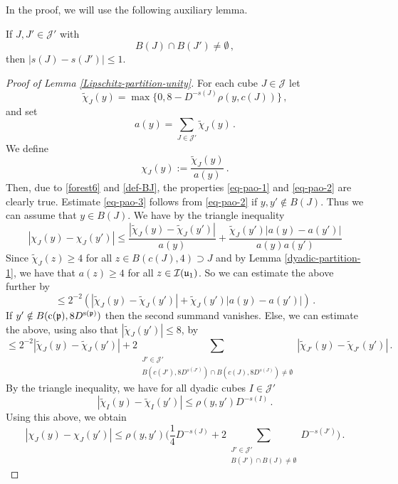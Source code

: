 {    In the proof, we will use the following auxiliary lemma.

    \begin{lemma}
        \label{moderate-scale-change}

        If $J, J' \in \mathcal{J'}$ with
        $$
            B(J) \cap B(J') \ne \emptyset\,,
        $$
        then $|s(J) - s(J')| \le 1$.
    \end{lemma}

    \begin{proof}[Proof of Lemma \ref{Lipschitz-partition-unity}]
        For each cube $J \in \mathcal{J}$ let
        $$
            \tilde\chi_J(y) = \max\{0, 8 - D^{-s(J)} \rho(y, c(J))\}\,,
        $$
        and set
        $$
            a(y) = \sum_{J \in \mathcal{J}'} \tilde \chi_J(y)\,.
        $$
        We define
        \[
            \chi_J(y) := \frac{\tilde \chi_J(y)}{a(y)}\,.
        \]
        Then, due to \eqref{forest6} and \eqref{def-BJ}, the properties \eqref{eq-pao-1} and \eqref{eq-pao-2} are clearly true. Estimate \eqref{eq-pao-3} follows from \eqref{eq-pao-2} if $y, y' \notin B(J)$. Thus we can assume that $y \in B(J)$. We have by the triangle inequality
        $$
            |\chi_J(y) - \chi_J(y')| \le \frac{|\tilde \chi_J(y) - \tilde \chi_J(y')|}{a(y)} + \frac{\tilde \chi_J(y')|a(y) - a(y')|}{a(y)a(y')}
        $$
        Since $\tilde \chi_J(z) \ge 4$ for all $z \in B(c(J), 4) \supset J$ and by Lemma \ref{dyadic-partition-1}, we have that $a(z) \ge 4$ for all $z \in {\mathcal{I}}({\mathfrak u}_1)$. So we can estimate the above further by
        $$
            \le 2^{-2}(|\tilde \chi_J(y) - \tilde \chi_J(y')| + \tilde \chi_J(y')|a(y) - a(y')|)\,.
        $$
        If $y' \notin B({\mathrm{c}}({\mathfrak p}), 8D^{{\mathrm{s}}({\mathfrak p})})$ then the second summand vanishes. Else, we can estimate the above, using also that $|\tilde \chi_J(y')| \le 8$, by
        $$
            \le 2^{-2} |\tilde \chi_J(y) - \tilde \chi_J(y')| + 2 \sum_{\substack{J' \in \mathcal{J}'\\ B(c(J'), 8D^{s(J')}) \cap B(c(J), 8D^{s(J)}) \ne \emptyset}}|\tilde \chi_{J'}(y) - \tilde \chi_{J'} (y')|\,.
        $$
        By the triangle inequality, we have for all dyadic cubes $I \in \mathcal{J}'$
        $$
            |\tilde \chi_I(y) - \tilde \chi_I(y')| \le \rho(y, y') D^{-s(I)}\,.
        $$
        Using this above, we obtain
        $$
            |\chi_J(y) - \chi_J(y')| \le \rho(y,y') \Big( \frac{1}{4} D^{-s(J)} + 2 \sum_{\substack{J' \in \mathcal{J}'\\ B(J') \cap B(J) \ne \emptyset}} D^{-s(J')}\Big)\,.
$$
\end{proof}}
